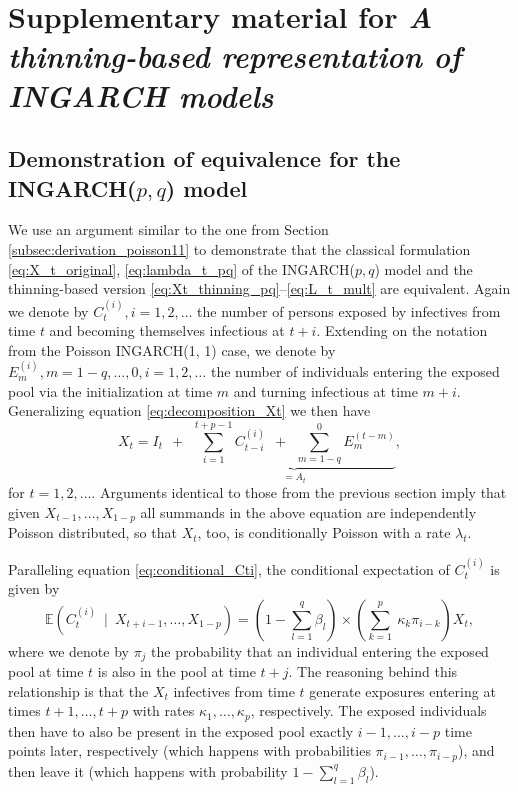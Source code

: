 \documentclass{article}
\begin{document}



\newpage


\section{Supplementary material for \textit{A thinning-based representation of INGARCH models}}

\subsection{Demonstration of equivalence for the INGARCH($p, q$) model}

We use an argument similar to the one from Section \ref{subsec:derivation_poisson11} to demonstrate that the classical formulation \eqref{eq:X_t_original}, \eqref{eq:lambda_t_pq} of the INGARCH($p, q$) model and the thinning-based version \eqref{eq:Xt_thinning_pq}--\eqref{eq:L_t_mult} are equivalent. Again we denote by $C_t^{(i)}, i = 1, 2, \dots$ the number of persons exposed by infectives from time $t$ and becoming themselves infectious at $t + i$. Extending on the notation from the Poisson INGARCH(1, 1) case, we denote by $E^{(i)}_m, m = 1 - q, \dots, 0, i = 1, 2, \dots$ the number of individuals entering the exposed pool via the initialization at time $m$ and turning infectious at time $m + i$. Generalizing equation \eqref{eq:decomposition_Xt} we then have
$$
X_t = I_t \ \ + \ \ \underbrace{\sum_{i = 1}^{t + p - 1} C_{t - i}^{(i)} \ \ + \ \ \sum_{m = 1 - q}^0 E_m^{(t - m)}}_{= A_t},
$$
for $t = 1, 2, \dots$. Arguments identical to those from the previous section imply that given $X_{t - 1}, \dots, X_{1 - p}$ all summands in the above equation are independently Poisson distributed, so that $X_t$, too, is conditionally Poisson with a rate $\lambda_t$.

Paralleling equation \eqref{eq:conditional_Cti}, the conditional expectation of $C_t^{(i)}$ is given by
\begin{equation}
\mathbb{E}(C_t^{(i)} \ \mid \ X_{t + i - 1}, \dots, X_{1 - p}) = \left(1 - \sum_{l = 1}^q \beta_l \right) \times \left(\sum_{k = 1}^p\ \kappa_k \pi_{i - k}\right) X_t,\label{eq:ELt}
\end{equation}
where we denote by $\pi_j$ the probability that an individual entering the exposed pool at time $t$ is also in the pool at time $t + j$. The reasoning behind this relationship is that the $X_t$ infectives from time $t$ generate exposures entering at times $t + 1, \dots, t + p$ with rates $\kappa_1, \dots, \kappa_p$, respectively. The exposed individuals then have to also be present in the exposed pool exactly $i - 1, \dots, i - p$ time points later, respectively (which happens with probabilities $\pi_{i - 1}, \dots, \pi_{i - p}$), and then leave it (which happens with probability $1 - \sum_{l = 1}^q \beta_l$).
\end{document}
